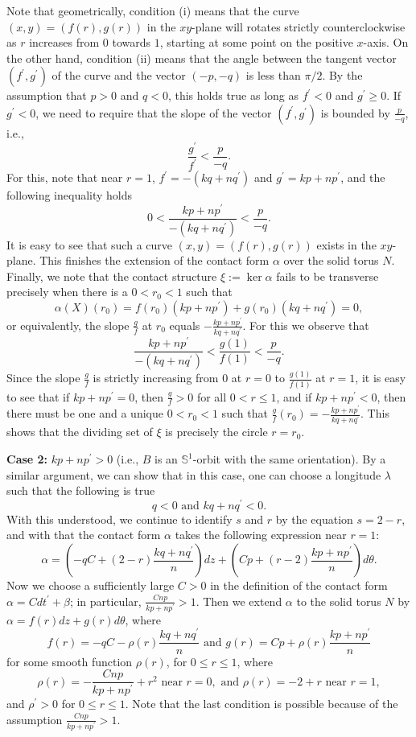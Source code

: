 \documentclass[11pt]{amsart}
\theoremstyle{plain}
\numberwithin{theorem}{section}
\theoremstyle{definition}
\newcommand{\s}{{\mathbb S}}
\begin{document}
Note that geometrically, condition (i) means that the curve $(x,y)=(f(r),g(r))$ in the $xy$-plane will
rotates strictly counterclockwise as $r$ increases from $0$ towards $1$, starting at some point on the positive $x$-axis. On the other hand, condition (ii) means that the angle between the tangent vector 
$(f^\prime,g^\prime)$ of the curve and the vector $(-p,-q)$ is less than $\pi/2$. By the assumption
that $p>0$ and $q<0$, this holds true as long as $f^\prime<0$ and $g^\prime\geq 0$. If $g^\prime<0$,
we need to require that the slope of the vector $(f^\prime,g^\prime)$ is bounded by $\frac{p}{-q}$, i.e.,
$$
\frac{g^\prime}{f^\prime}<\frac{p}{-q}. 
$$
For this, note that near $r=1$, $f^\prime=-(kq+nq^\prime)$ and $g^\prime=kp+np^\prime$, and the following inequality holds
$$
0<\frac{kp+np^\prime}{-(kq+nq^\prime)}<\frac{p}{-q}. 
$$
It is easy to see that such a curve $(x,y)=(f(r),g(r))$ exists in the $xy$-plane. This finishes the extension of the contact form $\alpha$ over the solid torus $N$. Finally, we note that the contact structure 
$\xi:=\ker\alpha$ fails to be transverse precisely when there is a $0<r_0<1$ such that
$$
\alpha(X)(r_0)=f(r_0)(kp+np^\prime)+g(r_0)(kq+nq^\prime)=0, 
$$
or equivalently, the slope $\frac{g}{f}$ at $r_0$ equals $-\frac{kp+np^\prime}{kq+nq^\prime}$. For this
we observe that
$$
\frac{kp+np^\prime}{-(kq+nq^\prime)}<\frac{g(1)}{f(1)}<\frac{p}{-q}. 
$$
Since the slope $\frac{g}{f}$ is strictly increasing from $0$ at $r=0$ to $\frac{g(1)}{f(1)}$ at $r=1$,
it is easy to see that if $kp+np^\prime=0$, then $\frac{g}{f}>0$ for all $0<r\leq 1$, and if 
$kp+np^\prime<0$, then there must be one and a unique $0<r_0<1$ such that 
$\frac{g}{f}(r_0)=-\frac{kp+np^\prime}{kq+nq^\prime}$. This shows that the dividing set of $\xi$ is precisely the circle $r=r_0$. 

\vspace{2mm}

{\bf Case 2:} $kp+np^\prime >0$ (i.e., $B$ is an $\s^1$-orbit with the same orientation). By a similar argument, we can show that in this case, one can choose a longitude $\lambda$ such that the following is true
$$
q<0 \mbox{ and } kq+nq^\prime<0.
$$
With this understood, we continue to identify $s$ and $r$ by the equation $s=2-r$, and with that 
the contact form $\alpha$ takes the following expression near $r=1$:
$$
\alpha=(-qC+(2-r)\frac{kq+nq^\prime}{n})dz+(Cp+(r-2)\frac{kp+np^\prime}{n})d\theta.
$$
Now we choose a sufficiently large $C>0$ in the definition of the contact form 
$\alpha=Cdt^\prime+\beta$; in particular, $\frac{Cnp}{kp+np^\prime}>1$. Then 
we extend $\alpha$ to the solid torus $N$ by $\alpha=f(r)dz+g(r)d\theta$, where
$$
f(r)=-qC-\rho(r)\frac{kq+nq^\prime}{n} \mbox{ and } g(r)= Cp+\rho(r)\frac{kp+np^\prime}{n}
$$
for some smooth function $\rho(r)$, for $0\leq r\leq 1$, where 
$$
\rho(r)=-\frac{Cnp}{kp+np^\prime}+r^2 \mbox{ near } r=0, \mbox{ and } 
\rho(r)=-2+r  \mbox{ near } r=1,
$$
and $\rho^\prime>0$ for $0\leq r\leq 1$. Note that the last condition is possible because of the assumption $\frac{Cnp}{kp+np^\prime}>1$. 
\end{document}
